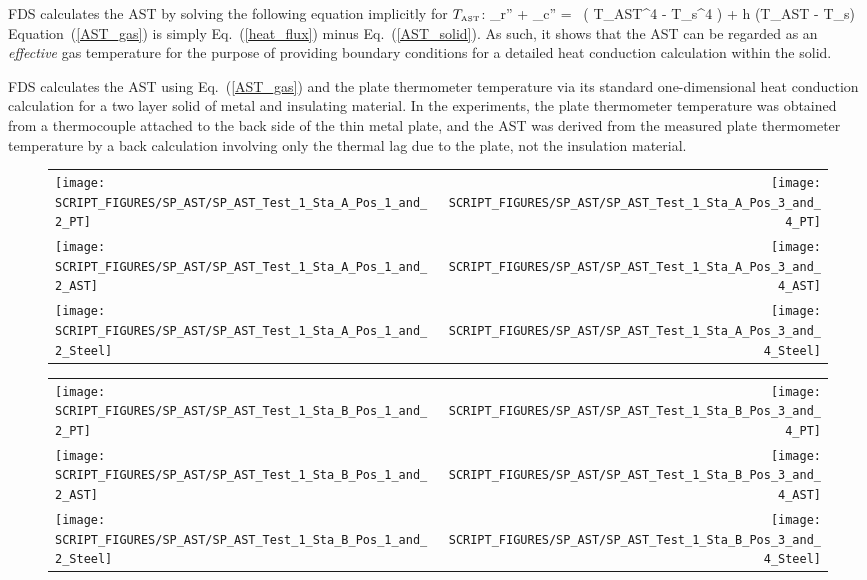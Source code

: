 FDS calculates the AST by solving the following equation implicitly for $T_{\hbox{\tiny AST}}$:
\be {}_r'' + _c'' = \epsilon \, \left( \sigma T_{\hbox{\tiny AST}}^4 - \sigma T_s^4 \right) + h (T_{\hbox{\tiny AST}} - T_s)  \label{AST_gas} \ee
Equation~(\ref{AST_gas}) is simply Eq.~(\ref{heat_flux}) minus Eq.~(\ref{AST_solid}). As such, it shows that the AST can be regarded as an {\em effective} gas temperature for
the purpose of providing boundary conditions for a detailed heat conduction calculation within the solid.

FDS calculates the AST using Eq.~(\ref{AST_gas}) and the plate thermometer temperature via its standard one-dimensional heat conduction calculation for a
two layer solid of metal and insulating material. In the experiments, the plate thermometer temperature was obtained from a thermocouple attached to the back side of
the thin metal plate, and the AST was derived from the measured plate thermometer temperature by a back calculation involving only the thermal lag due to the
plate, not the insulation material.

\newpage


\begin{figure}[p]
\begin{tabular*}{\textwidth}{l@{\extracolsep{\fill}}r}
\texttt{[image: SCRIPT\_FIGURES/SP\_AST/SP\_AST\_Test\_1\_Sta\_A\_Pos\_1\_and\_2\_PT]} &
\texttt{[image: SCRIPT\_FIGURES/SP\_AST/SP\_AST\_Test\_1\_Sta\_A\_Pos\_3\_and\_4\_PT]} \\
\texttt{[image: SCRIPT\_FIGURES/SP\_AST/SP\_AST\_Test\_1\_Sta\_A\_Pos\_1\_and\_2\_AST]} &
\texttt{[image: SCRIPT\_FIGURES/SP\_AST/SP\_AST\_Test\_1\_Sta\_A\_Pos\_3\_and\_4\_AST]} \\
\texttt{[image: SCRIPT\_FIGURES/SP\_AST/SP\_AST\_Test\_1\_Sta\_A\_Pos\_1\_and\_2\_Steel]} &
\texttt{[image: SCRIPT\_FIGURES/SP\_AST/SP\_AST\_Test\_1\_Sta\_A\_Pos\_3\_and\_4\_Steel]}
\end{tabular*}
\label{SP_Test_1_Station_A}
\end{figure}

\begin{figure}[p]
\begin{tabular*}{\textwidth}{l@{\extracolsep{\fill}}r}
\texttt{[image: SCRIPT\_FIGURES/SP\_AST/SP\_AST\_Test\_1\_Sta\_B\_Pos\_1\_and\_2\_PT]} &
\texttt{[image: SCRIPT\_FIGURES/SP\_AST/SP\_AST\_Test\_1\_Sta\_B\_Pos\_3\_and\_4\_PT]} \\
\texttt{[image: SCRIPT\_FIGURES/SP\_AST/SP\_AST\_Test\_1\_Sta\_B\_Pos\_1\_and\_2\_AST]} &
\texttt{[image: SCRIPT\_FIGURES/SP\_AST/SP\_AST\_Test\_1\_Sta\_B\_Pos\_3\_and\_4\_AST]} \\
\texttt{[image: SCRIPT\_FIGURES/SP\_AST/SP\_AST\_Test\_1\_Sta\_B\_Pos\_1\_and\_2\_Steel]} &
\texttt{[image: SCRIPT\_FIGURES/SP\_AST/SP\_AST\_Test\_1\_Sta\_B\_Pos\_3\_and\_4\_Steel]}
\end{tabular*}
\label{SP_Test_1_Station_B}
\end{figure}

